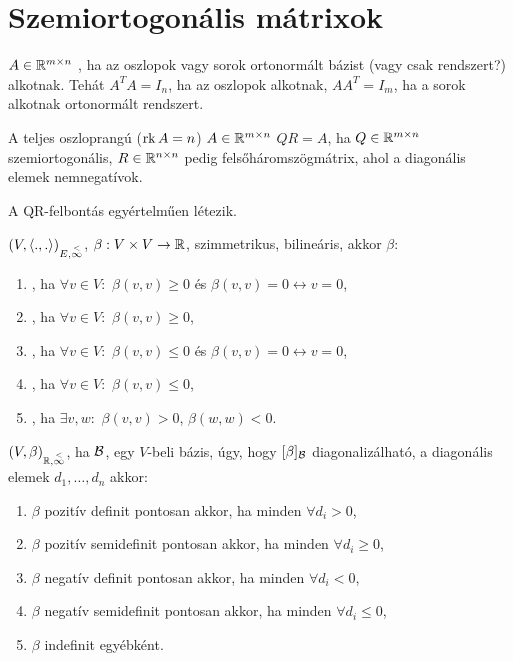 \documentclass{article}
\begin{document}
\section{Szemiortogonális mátrixok}
	\begin{ff}
		$A\in\mathbb{R}^{m\times n}$ , ha az oszlopok vagy sorok ortonormált
		bázist (vagy csak rendszert?) alkotnak. Tehát $A^TA=I_n$, ha az oszlopok
		alkotnak, $AA^T=I_m$, ha a sorok alkotnak ortonormált rendszert.
	\end{ff}
	\begin{ff}
		A teljes oszloprangú ($\operatorname{rk}{A}=n$) $A\in\mathbb{R}^{m\times n}$  $QR=A$, ha
		$Q\in\mathbb{R}^{m\times n}$ szemiortogonális, $R\in\mathbb{R}^{n\times n}$ pedig felsőháromszögmátrix, ahol a
		diagonális elemek nemnegatívok.
	\end{ff}
	\begin{tet}
		A QR-felbontás egyértelműen létezik.
	\end{tet}
	\begin{ff}
		$(V,\langle.,.\rangle)_{E,\overset{<}{\infty}}$, $\beta:V\times V\to \mathbb{R}$, szimmetrikus, bilineáris, akkor
	$\beta:$	
		\begin{enumerate}
			\item {}, ha $\forall v\in V:$ $\beta(v,v)\ge 0$ és
				$\beta(v,v)=0\leftrightarrow v=0$,
			\item {}, ha $\forall v\in V:$ $\beta(v,v)\ge 0$,
			\item {}, ha $\forall v\in V:$ $\beta(v,v)\leq 0$ és
				$\beta(v,v)=0\leftrightarrow v=0$,
			\item {}, ha $\forall v\in V:$ $\beta(v,v)\leq 0$,
			\item {}, ha $\exists v,w:$ $\beta(v,v)>0$, $\beta(w,w)<0$.
		\end{enumerate}
	\end{ff}
\begin{all}
		$(V,\beta)_{\mathbb{R},\overset{<}{\infty}}$, ha $\mathcal{B}$, egy $V$-beli bázis, úgy, hogy $[\beta]_{\mathcal{B}}$ 
		diagonalizálható, a diagonális elemek $d_1,\dots,d_n$ akkor:
		\begin{enumerate}
			\item $\beta$ pozitív definit pontosan akkor, ha minden $\forall
				d_i>0$,
			\item $\beta$ pozitív semidefinit pontosan akkor, ha minden
				$\forall d_i\geq 0$,
			\item $\beta$ negatív definit pontosan akkor, ha minden $\forall d_i<0$,
			\item $\beta$ negatív semidefinit pontosan akkor, ha minden
				$\forall d_i\leq 0$,
			\item $\beta$ indefinit egyébként.
		\end{enumerate}
	\end{all}
\end{document}
